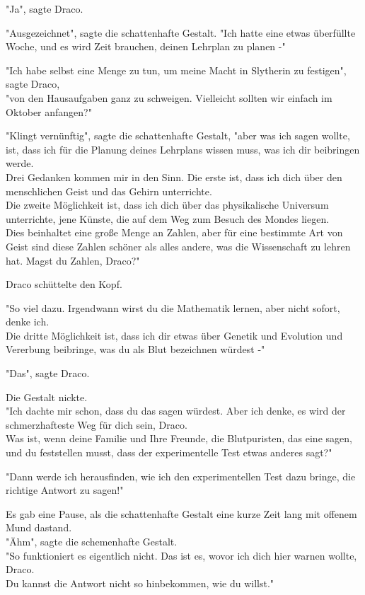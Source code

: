{"Ja", sagte Draco.

"Ausgezeichnet", sagte die schattenhafte Gestalt. "Ich hatte eine etwas überfüllte Woche, und es wird Zeit brauchen, deinen Lehrplan zu planen -"

"Ich habe selbst eine Menge zu tun, um meine Macht in Slytherin zu festigen", sagte Draco,\\ "von den Hausaufgaben ganz zu schweigen. Vielleicht sollten wir einfach im Oktober anfangen?"

"Klingt vernünftig", sagte die schattenhafte Gestalt, "aber was ich sagen wollte, ist, dass ich für die Planung deines Lehrplans wissen muss, was ich dir beibringen werde.\\ Drei Gedanken kommen mir in den Sinn. Die erste ist, dass ich dich über den menschlichen Geist und das Gehirn unterrichte.\\ Die zweite Möglichkeit ist, dass ich dich über das physikalische Universum unterrichte, jene Künste, die auf dem Weg zum Besuch des Mondes liegen.\\ Dies beinhaltet eine große Menge an Zahlen, aber für eine bestimmte Art von Geist sind diese Zahlen schöner als alles andere, was die Wissenschaft zu lehren hat. Magst du Zahlen, Draco?"

Draco schüttelte den Kopf.

"So viel dazu. Irgendwann wirst du die Mathematik lernen, aber nicht sofort, denke ich.\\ Die dritte Möglichkeit ist, dass ich dir etwas über Genetik und Evolution und Vererbung beibringe, was du als Blut bezeichnen würdest -"

"Das", sagte Draco.

Die Gestalt nickte.\\ "Ich dachte mir schon, dass du das sagen würdest. Aber ich denke, es wird der schmerzhafteste Weg für dich sein, Draco.\\ Was ist, wenn deine Familie und Ihre Freunde, die Blutpuristen, das eine sagen, und du feststellen musst, dass der experimentelle Test etwas anderes sagt?"

"Dann werde ich herausfinden, wie ich den experimentellen Test dazu bringe, die richtige Antwort zu sagen!"

Es gab eine Pause, als die schattenhafte Gestalt eine kurze Zeit lang mit offenem Mund dastand.\\ "Ähm", sagte die schemenhafte Gestalt.\\ "So funktioniert es eigentlich nicht. Das ist es, wovor ich dich hier warnen wollte, Draco.\\ Du kannst die Antwort nicht so hinbekommen, wie du willst."

}
